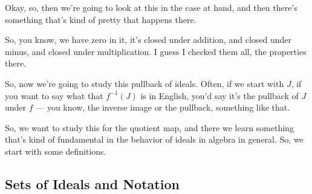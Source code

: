 \begin{speech}[00:14:42 - 00:16:01]
Okay, so, then we're going to look at this in the case at hand, and then there's something that's kind of pretty that happens there. 

So, you know, we have zero in it, it's closed under addition, and closed under minus, and closed under multiplication. I guess I checked them all, the properties there.

So, now we're going to study this pullback of ideals. Often, if we start with $J$, if you want to say what that $f^{-1}(J)$ is in English, you'd say it's the pullback of $J$ under $f$ --- you know, the inverse image or the pullback, something like that.

So, we want to study this for the quotient map, and there we learn something that's kind of fundamental in the behavior of ideals in algebra in general. So, we start with some definitions.
\end{speech}

\subsection{Sets of Ideals and Notation}

